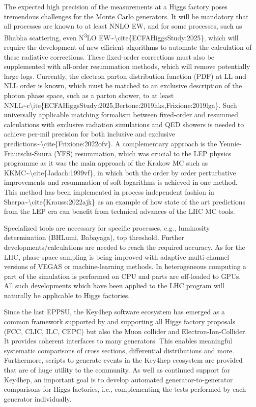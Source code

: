 The expected high precision of the measurements at a Higgs factory poses
tremendous challenges for the Monte Carlo generators. It will be
mandatory that all processes are known to at least NNLO EW, and for some
processes, such as Bhabha scattering, even N\textsuperscript{3}LO
EW\textasciitilde\textbackslash cite\{ECFAHiggsStudy:2025\}, which will
require the development of new efficient algorithms to automate the
calculation of these radiative corrections. These fixed-order
corrections must also be supplemented with all-order resummation
methods, which will remove potentially large logs. Currently, the
electron parton distribution function (PDF) at LL and NLL order is
known, which must be matched to an exclusive description of the photon
phase space, such as a parton shower, to at least
NNLL\textasciitilde c\textbackslash ite\{ECFAHiggsStudy:2025,Bertone:2019hks,Frixione:2019lga\}.
Such universally applicable matching formalism between fixed-order and
resummed calculations with exclusive radiation simulations and QED
showers is needed to achieve per-mil precision for both inclusive and
exclusive
predictions\textasciitilde\textbackslash cite\{Frixione:2022ofv\}. A
complementary approach is the Yennie-Frautschi-Suura (YFS) resummation,
which was crucial to the LEP physics programme as it was the main
approach of the Krakow MC such as
KKMC\textasciitilde\textbackslash cite\{Jadach:1999vf\}, in which both
the order by order perturbative improvements and resummation of soft
logarithms is achieved in one method. This method has been implemented
in process independent fashion in
Sherpa\textasciitilde\textbackslash cite\{Krauss:2022ajk\} as an example
of how state of the art predictions from the LEP era can benefit from
technical advances of the LHC MC tools.

Specialized tools are necessary for specific processes, e.g., luminosity
determination (BHLumi, Babayaga), top threshold. Further
developments/calculations are needed to reach the required accuracy. As
for the LHC, phase-space sampling is being improved with adaptive
multi-channel versions of VEGAS or machine-learning methods. In
heterogeneous computing a part of the simulation is performed on CPU and
parts are off-loaded to GPUs. All such developments which have been
applied to the LHC program will naturally be applicable to Higgs
factories.

Since the last EPPSU, the Key4hep software ecosystem has emerged as a
common framework supported by and supporting all Higgs factory proposals
(FCC, CLIC, ILC, CEPC) but also the Muon collider and
Electron-Ion-Collider. It provides coherent interfaces to many
generators. This enables meaningful systematic comparisons of cross
sections, differential distributions and more. Furthermore, scripts to
generate events in the Key4hep ecosystem are provided that are of huge
utility to the community. As well as continued support for Key4hep, an
important goal is to develop automated generator-to-generator
comparisons for Higgs factories, i.e., complementing the tests performed
by each generator individually.

